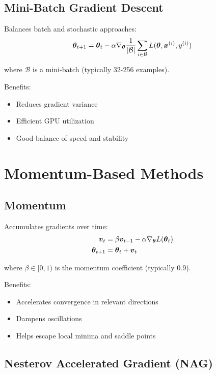 \subsection{Mini-Batch Gradient Descent}

Balances batch and stochastic approaches:
\begin{equation}
\boldsymbol{\theta}_{t+1} = \boldsymbol{\theta}_t - \alpha \nabla_{\boldsymbol{\theta}} \frac{1}{|\mathcal{B}|} \sum_{i \in \mathcal{B}} L(\boldsymbol{\theta}, \boldsymbol{x}^{(i)}, y^{(i)})
\end{equation}

where $\mathcal{B}$ is a mini-batch (typically 32-256 examples).

Benefits:
\begin{itemize}
    \item Reduces gradient variance
    \item Efficient GPU utilization
    \item Good balance of speed and stability
\end{itemize}

\section{Momentum-Based Methods}
\label{sec:momentum}

\subsection{Momentum}

Accumulates gradients over time:
\begin{align}
\boldsymbol{v}_t &= \beta \boldsymbol{v}_{t-1} - \alpha \nabla_{\boldsymbol{\theta}} L(\boldsymbol{\theta}_t) \\
\boldsymbol{\theta}_{t+1} &= \boldsymbol{\theta}_t + \boldsymbol{v}_t
\end{align}

where $\beta \in [0, 1)$ is the momentum coefficient (typically 0.9).

Benefits:
\begin{itemize}
    \item Accelerates convergence in relevant directions
    \item Dampens oscillations
    \item Helps escape local minima and saddle points
\end{itemize}

\subsection{Nesterov Accelerated Gradient (NAG)}

